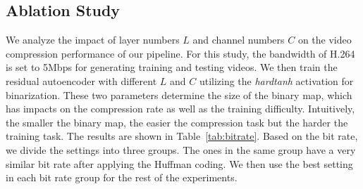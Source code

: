 \documentclass[letterpaper]{article} %
\begin{document}
\subsection{Ablation Study}

{} We analyze the impact of layer numbers $L$ and channel numbers $C$ on the video compression performance of our pipeline. For this study, the bandwidth of H.264 is set to 5Mbps for generating training and testing videos. We then train the residual autoencoder with different $L$ and $C$ utilizing the \textit{hardtanh} activation for binarization. These two parameters determine the size of the binary map, which has impacts on the compression rate as well as the training difficulty. Intuitively, the smaller the binary map, the easier the compression task but the harder the training task. The results are shown in Table~\ref{tab:bitrate}. Based on the bit rate, we divide the settings into three groups. The ones in the same group have a very similar bit rate after applying the Huffman coding. We then use the best setting in each bit rate group for the rest of the experiments.
\end{document}
